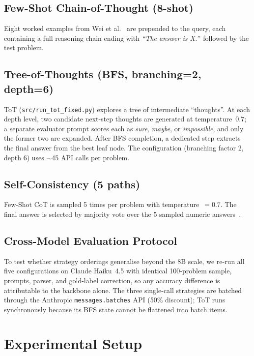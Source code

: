 \documentclass[conference]{IEEEtran}
\begin{document}
\subsection{Few-Shot Chain-of-Thought (8-shot)}
Eight worked examples from Wei et al.~\cite{wei2022cot} are prepended
to the query, each containing a full reasoning chain ending with
\textit{``The answer is X.''}\ followed by the test problem.

\subsection{Tree-of-Thoughts (BFS, branching=2, depth=6)}
\label{sec:method:totfixed}
ToT (\texttt{src/run\_tot\_fixed.py}) explores a tree of intermediate
``thoughts''.
At each depth level, two candidate next-step thoughts are generated at
temperature~$0.7$; a separate evaluator prompt scores each as
\textit{sure}, \textit{maybe}, or \textit{impossible}, and only the
former two are expanded.
After BFS completion, a dedicated step extracts the final answer from
the best leaf node.
The configuration (branching factor 2, depth 6) uses $\sim$45 API calls
per problem.

\subsection{Self-Consistency (5 paths)}
Few-Shot CoT is sampled 5 times per problem with temperature~$= 0.7$.
The final answer is selected by majority vote over the 5 sampled
numeric answers~\cite{wang2022selfconsistency}.

\subsection{Cross-Model Evaluation Protocol}
\label{sec:method:crossmodel}
To test whether strategy orderings generalise beyond the 8B scale, we
re-run all five configurations on Claude Haiku~4.5 with identical
100-problem sample, prompts, parser, and gold-label correction, so any
accuracy difference is attributable to the backbone alone.
The three single-call strategies are batched through the Anthropic
\texttt{messages.batches} API (50\% discount); ToT runs synchronously
because its BFS state cannot be flattened into batch items.

\section{Experimental Setup}
\label{sec:setup}
\end{document}
